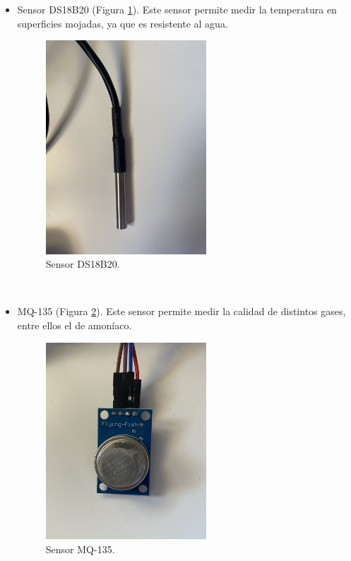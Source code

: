 \begin{itemize}
\item{Sensor DS18B20 (Figura \ref{fig:ds}).} Este sensor permite medir la temperatura en superficies mojadas, ya que es resistente al agua.
\begin{figure} [h!]
  \begin{center}
    \includegraphics[width=6cm]{figs/ds}
  \end{center}
  \caption{Sensor DS18B20.}
  \label{fig:ds}
\end{figure}\\

\item{MQ-135 (Figura \ref{fig:mq}).} Este sensor permite medir la calidad de distintos gases, entre ellos el de amoníaco.
\begin{figure} [h!]
  \begin{center}
    \includegraphics[width=6cm]{figs/mq}
  \end{center}
  \caption{Sensor MQ-135.}
  \label{fig:mq}
\end{figure}\\


\end{itemize}
